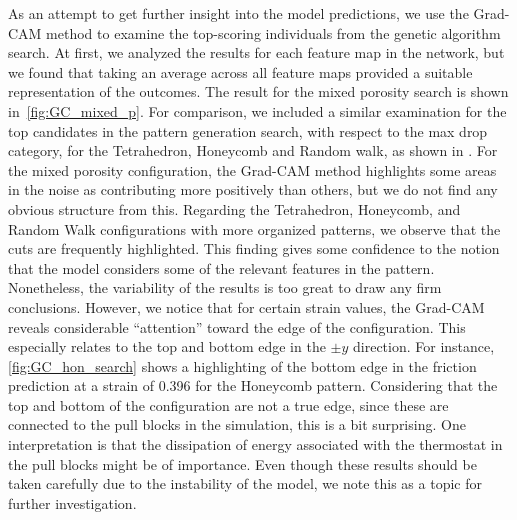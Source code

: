 As an attempt to get further insight into the model predictions, we use the Grad-CAM method to examine the top-scoring individuals from the genetic algorithm search. At first, we analyzed the results for each feature map in the network, but we found that taking an average across all feature maps provided a suitable representation of the outcomes. The result for the mixed porosity search is shown in~\cref{fig:GC_mixed_p}. For 
comparison, we included a similar examination for the top candidates in the
pattern generation search, with respect to the max drop category, for the
Tetrahedron, Honeycomb and Random walk, as shown in
. For the mixed porosity configuration, the Grad-CAM method highlights some areas in the noise 
as contributing more positively than others, but we do not find any obvious
structure from this. Regarding the Tetrahedron, Honeycomb, and Random Walk configurations with more organized patterns, we observe that the cuts are frequently highlighted. This finding gives some confidence to the notion that the model considers some of the relevant features in the pattern. Nonetheless, the variability of the results is too great to draw any firm conclusions. However, we notice that
for certain strain values, the Grad-CAM reveals considerable ``attention'' toward the edge of the configuration. This especially relates to the top and bottom edge in the $\pm y$ direction. For instance, \cref{fig:GC_hon_search} shows a highlighting of the bottom edge in the friction prediction at a strain of 0.396 for the Honeycomb pattern. Considering that the top and bottom of the configuration are not a true edge, since these are connected to the pull blocks in the simulation, this is a bit surprising. One interpretation is that the dissipation of energy associated with the thermostat in the pull blocks might be of importance. Even though these results should be taken carefully due to the instability of the model, we note this as a topic for further investigation. 


